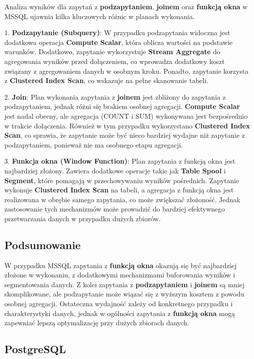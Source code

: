 \documentclass{article}
\begin{document}
Analiza wyników dla zapytań z \textbf{podzapytaniem}, \textbf{joinem} oraz \textbf{funkcją okna} w MSSQL ujawnia kilka kluczowych różnic w planach wykonania. 

1. \textbf{Podzapytanie (Subquery)}:
   W przypadku podzapytania widoczna jest dodatkowa operacja \textbf{Compute Scalar}, która oblicza wartości na podstawie warunków. Dodatkowo, zapytanie wykorzystuje \textbf{Stream Aggregate} do agregowania wyników przed dołączeniem, co wprowadza dodatkowy koszt związany z agregowaniem danych w osobnym kroku. Ponadto, zapytanie korzysta z \textbf{Clustered Index Scan}, co wskazuje na pełne skanowanie tabeli.

2. \textbf{Join}:
   Plan wykonania zapytania z \textbf{joinem} jest zbliżony do zapytania z podzapytaniem, jednak różni się brakiem osobnej agregacji. \textbf{Compute Scalar} jest nadal obecny, ale agregacja (COUNT i SUM) wykonywana jest bezpośrednio w trakcie dołączenia. Również w tym przypadku wykorzystano \textbf{Clustered Index Scan}, co sprawia, że zapytanie może być nieco bardziej wydajne niż zapytanie z podzapytaniem, ponieważ nie ma osobnego etapu agregacji.

3. \textbf{Funkcja okna (Window Function)}:
   Plan zapytania z funkcją okna jest najbardziej złożony. Zawiera dodatkowe operacje takie jak \textbf{Table Spool} i \textbf{Segment}, które pomagają w przechowywaniu wyników pośrednich. Zapytanie wykonuje \textbf{Clustered Index Scan} na tabeli, a agregacja z funkcją okna jest realizowana w obrębie samego zapytania, co może zwiększać złożoność. Jednak zastosowanie tych mechanizmów może prowadzić do bardziej efektywnego przetwarzania danych w przypadku dużych zbiorów.

\subsection*{Podsumowanie}

W przypadku MSSQL zapytania z \textbf{funkcją okna} okazują się być najbardziej złożone w wykonaniu, z dodatkowymi mechanizmami buforowania wyników i segmentowania danych. Z kolei zapytania z \textbf{podzapytaniem} i \textbf{joinem} są mniej skomplikowane, ale podzapytanie może wiązać się z wyższym kosztem z powodu osobnej agregacji. Ostateczna wydajność zależy od konkretnego przypadku i charakterystyki danych, jednak w ogólności zapytania z \textbf{funkcją okna} mogą zapewniać lepszą optymalizację przy dużych zbiorach danych.

\subsection*{PostgreSQL}
\end{document}
